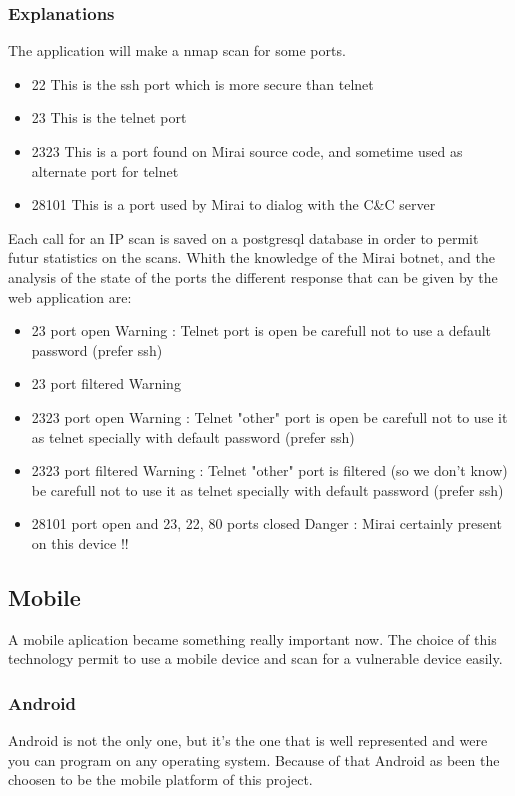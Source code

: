 \documentclass{report}
\begin{document}
\subsubsection{Explanations}
The application will make a nmap scan for some ports.
\begin{itemize}
 \item 22 This is the ssh port which is more secure than telnet
 \item 23 This is the telnet port
 \item 2323 This is a port found on Mirai source code, and sometime used as alternate port for telnet
 \item 28101 This is a port used by Mirai to dialog with the C\&C server
\end{itemize}
Each call for an IP scan is saved on a postgresql database in order to permit futur statistics on the scans. Whith the knowledge of the Mirai botnet, and the analysis of the state of the ports the different response that can be given by the web application are:
\begin{itemize}
\item 23 port open\newline
  Warning : Telnet port is open be carefull not to use a default password (prefer ssh)
\item 23 port filtered\newline
  Warning
\item 2323 port open\newline
  Warning : Telnet "other" port is open be carefull not to use it as telnet specially with default password (prefer ssh)
\item 2323 port filtered\newline
  Warning : Telnet "other" port is filtered (so we don't know) be carefull not to use it as telnet specially with default password (prefer ssh)
\item 28101 port open and 23, 22, 80 ports closed\newline
  Danger : Mirai certainly present on this device !!
\end{itemize}

\subsection{Mobile}
A mobile aplication became something really important now. The choice of this technology permit to use a mobile device and scan for a vulnerable device easily.

\subsubsection{Android}
Android is not the only one, but it's the one that is well represented and were you can program on any operating system. Because of that Android as been the choosen to be the mobile platform of this project.
\end{document}
